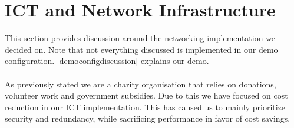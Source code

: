 
\section{ICT and Network Infrastructure}

%

This section provides discussion around the networking implementation we decided on. Note that not everything discussed is implemented in our demo configuration. \ref{democonfigdiscussion} explains our demo.
\\
\\
As previously stated we are a charity organisation that relies on donations, volunteer work and government subsidies. Due to this we have focused on cost reduction in our ICT implementation. This has caused us to mainly prioritize security and redundancy, while sacrificing performance in favor of cost savings.

